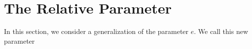 \documentclass[main.tex]{subfiles}
\begin{document}
\section{The Relative Parameter}

In this section, we consider a generalization of the parameter $e$. We call this new parameter
\end{document}
